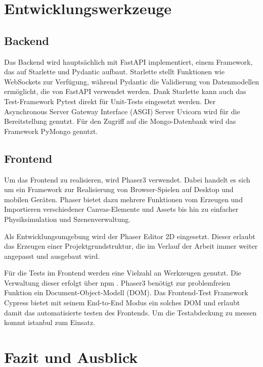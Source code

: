 \documentclass[a4paper, 10pt, conference]{IEEEtran}
\begin{document}
\section{Entwicklungswerkzeuge}\label{sec:entwicklungswerkzeuge}



\subsection{Backend}\label{subsec:backend-dev-tools}
Das Backend wird hauptsächlich mit FastAPI implementiert, einem Framework, das auf Starlette \cite{starlette} und Pydantic \cite{pydantic} aufbaut. Starlette stellt Funktionen wie WebSockets zur Verfügung, während Pydantic die Validierung von Datenmodellen ermöglicht, die von FastAPI verwendet werden. Dank Starlette kann auch das Test-Framework Pytest \cite{pytest} direkt für Unit-Tests eingesetzt werden. Der Asynchronous Server Gateway Interface (ASGI) Server Uvicorn \cite{uvicorn} wird für die Bereitstellung genutzt. Für den Zugriff auf die Mongo-Datenbank wird das Framework PyMongo \cite{pymongo} genutzt. 




\subsection{Frontend}\label{subsec:frontend-dev-tools}

Um das Frontend zu realisieren, wird Phaser3 \cite{phaser} verwendet. Dabei handelt es sich um ein Framework zur Realisierung von Browser-Spielen auf Desktop und mobilen Geräten. Phaser bietet dazu mehrere Funktionen vom Erzeugen und Importieren verschiedener Canvas-Elemente und Assets bis hin zu einfacher Physiksimulation und Szenenverwaltung.

Als Entwicklungsumgebung wird der Phaser Editor 2D eingesetzt. Dieser erlaubt das Erzeugen einer Projektgrundstruktur, die im Verlauf der Arbeit immer weiter angepasst und ausgebaut wird.  

Für die Tests im Frontend werden eine Vielzahl an Werkzeugen genutzt. Die Verwaltung dieser erfolgt über npm \cite{npm}. Phaser3 benötigt zur problemfreien Funktion ein Document-Object-Modell (DOM). Das Frontend-Test Framework Cypress \cite{cypress} bietet mit seinem End-to-End Modus ein solches DOM und erlaubt damit das automatisierte testen des Frontends. Um die Testabdeckung zu messen kommt istanbul \cite{istanbul} zum Einsatz.



\section{Fazit und Ausblick}\label{sec:fazit}




\printbibliography
\end{document}
